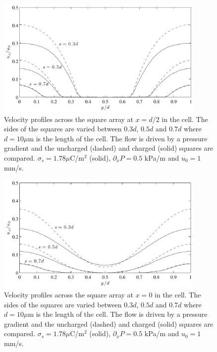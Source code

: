 \begin{figure}
\begin{center}
\includegraphics[width=0.9\textwidth]{fig/square_u_mid.pdf}
\end{center}
\caption[Section of the velocity field through a square
  array.]{Velocity profiles across the square array at $x = d/2$ in
  the cell. The sides of the squares are varied between $0.3d$, $0.5d$
  and $0.7d$ where $d = 10 \mu$m is the length of the cell. The flow
  is driven by a pressure gradient and the uncharged (dashed) and
  charged (solid) squares are compared. $\sigma_s = 1.78 \mu$C/m$^2$
  (solid), $\partial_xP = 0.5$ kPa/m and $u_0 = 1$ mm/s. }
\label{fig:res:mid}
\end{figure}

\begin{figure}
\begin{center}
\includegraphics[width=0.9\textwidth]{fig/square_pre_u.pdf}
\end{center}
\caption[Section of the velocity field through a square
  array.]{Velocity profiles across the square array at $x = 0$ in the
  cell. The sides of the squares are varied between $0.3d$, $0.5d$ and
  $0.7d$ where $d = 10 \mu$m is the length of the cell. The flow is
  driven by a pressure gradient and the uncharged (dashed) and charged
  (solid) squares are compared. $\sigma_s = 1.78 \mu$C/m$^2$ (solid),
  $\partial_xP = 0.5$ kPa/m and $u_0 = 1$ mm/s. }
\label{fig:res:pre}
\end{figure}
